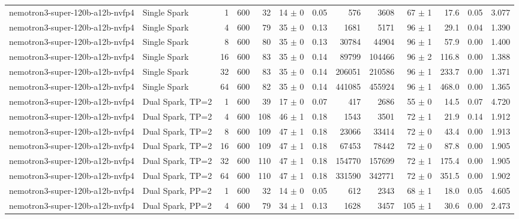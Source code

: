 \begin{tabular}{l l r r r r r r r r r r r}
\addlinespace
nemotron3-super-120b-a12b-nvfp4 & Single Spark & 1 & 600 & 32\rlap{$^\dagger$} & 14 $\pm$ 0 & 0.05 & 576 & 3608 & 67 $\pm$ 1 & 17.6 & 0.05 & 3.077 \\
nemotron3-super-120b-a12b-nvfp4 & Single Spark & 4 & 600 & 79\rlap{$^\dagger$} & 35 $\pm$ 0 & 0.13 & 1681 & 5171 & 96 $\pm$ 1 & 29.1 & 0.04 & 1.390 \\
nemotron3-super-120b-a12b-nvfp4 & Single Spark & 8 & 600 & 80\rlap{$^\dagger$} & 35 $\pm$ 0 & 0.13 & 30784 & 44904 & 96 $\pm$ 1 & 57.9 & 0.00 & 1.400 \\
nemotron3-super-120b-a12b-nvfp4 & Single Spark & 16 & 600 & 83\rlap{$^\dagger$} & 35 $\pm$ 0 & 0.14 & 89799 & 104466 & 96 $\pm$ 2 & 116.8 & 0.00 & 1.388 \\
nemotron3-super-120b-a12b-nvfp4 & Single Spark & 32 & 600 & 83\rlap{$^\dagger$} & 35 $\pm$ 0 & 0.14 & 206051 & 210586 & 96 $\pm$ 1 & 233.7 & 0.00 & 1.371 \\
nemotron3-super-120b-a12b-nvfp4 & Single Spark & 64 & 600 & 82\rlap{$^\dagger$} & 35 $\pm$ 0 & 0.14 & 441085 & 455924 & 96 $\pm$ 1 & 468.0 & 0.00 & 1.365 \\
\addlinespace
nemotron3-super-120b-a12b-nvfp4 & Dual Spark, TP=2 & 1 & 600 & 39\rlap{$^\dagger$} & 17 $\pm$ 0 & 0.07 & 417 & 2686 & 55 $\pm$ 0 & 14.5 & 0.07 & 4.720 \\
nemotron3-super-120b-a12b-nvfp4 & Dual Spark, TP=2 & 4 & 600 & 108 & 46 $\pm$ 1 & 0.18 & 1543 & 3501 & 72 $\pm$ 1 & 21.9 & 0.14 & 1.912 \\
nemotron3-super-120b-a12b-nvfp4 & Dual Spark, TP=2 & 8 & 600 & 109 & 47 $\pm$ 1 & 0.18 & 23066 & 33414 & 72 $\pm$ 0 & 43.4 & 0.00 & 1.913 \\
nemotron3-super-120b-a12b-nvfp4 & Dual Spark, TP=2 & 16 & 600 & 109 & 47 $\pm$ 1 & 0.18 & 67453 & 78442 & 72 $\pm$ 0 & 87.8 & 0.00 & 1.905 \\
nemotron3-super-120b-a12b-nvfp4 & Dual Spark, TP=2 & 32 & 600 & 110 & 47 $\pm$ 1 & 0.18 & 154770 & 157699 & 72 $\pm$ 1 & 175.4 & 0.00 & 1.905 \\
nemotron3-super-120b-a12b-nvfp4 & Dual Spark, TP=2 & 64 & 600 & 110 & 47 $\pm$ 1 & 0.18 & 331590 & 342771 & 72 $\pm$ 0 & 351.5 & 0.00 & 1.902 \\
\addlinespace
nemotron3-super-120b-a12b-nvfp4 & Dual Spark, PP=2 & 1 & 600 & 32\rlap{$^\dagger$} & 14 $\pm$ 0 & 0.05 & 612 & 2343 & 68 $\pm$ 1 & 18.0 & 0.05 & 4.605 \\
nemotron3-super-120b-a12b-nvfp4 & Dual Spark, PP=2 & 4 & 600 & 79\rlap{$^\dagger$} & 34 $\pm$ 1 & 0.13 & 1628 & 3457 & 105 $\pm$ 1 & 30.6 & 0.00 & 2.473 \\

\end{tabular}
